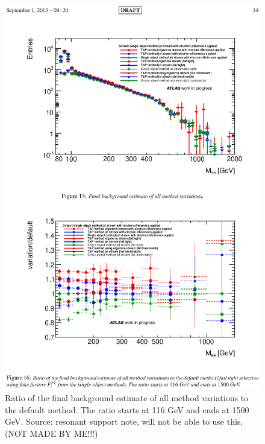    \begin{figure}[h]
      \begin{center}
      \includegraphics[scale=1,trim={3cm 5.5cm 3cm 14cm},clip]{images/ff_bkg_variation.ps}
      \end{center}
   \caption{Ratio of the final background estimate of all method variations to the default method. The ratio starts at 116 GeV and ends at 1500 GeV. Source: resonant support note, will not be able to use this. (NOT MADE BY ME!!!)}
   \label{fig:ff_bkg_variation}
   \end{figure}











